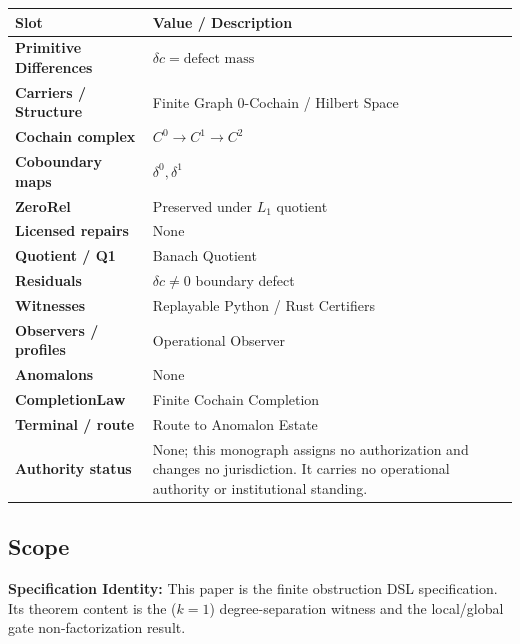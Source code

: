 \documentclass[
]{article}
\renewenvironment{quote}
  {\begin{leftbar}\small}
  {\end{leftbar}}
\begin{document}
\begin{longtable}[]{@{}
  >{\raggedright\arraybackslash}p{}
  >{\raggedright\arraybackslash}p{}@{}}
\toprule\noalign{}
\begin{minipage}[b]{\linewidth}\raggedright
Slot
\end{minipage} & \begin{minipage}[b]{\linewidth}\raggedright
Value / Description
\end{minipage} \\
\midrule\noalign{}
\endhead
\bottomrule\noalign{}
\endlastfoot
\textbf{Primitive Differences} & \(\delta c = \text{{defect mass}}\) \\
\textbf{Carriers / Structure} & Finite Graph 0-Cochain / Hilbert Space \\
\textbf{Cochain complex} & \(C^0 \to C^1 \to C^2\) \\
\textbf{Coboundary maps} & \(\delta^0, \delta^1\) \\
\textbf{ZeroRel} & Preserved under \(L_1\) quotient \\
\textbf{Licensed repairs} & None \\
\textbf{Quotient / Q1} & Banach Quotient \\
\textbf{Residuals} & \(\delta c \neq 0\) boundary defect \\
\textbf{Witnesses} & Replayable Python / Rust Certifiers \\
\textbf{Observers / profiles} & Operational Observer \\
\textbf{Anomalons} & None \\
\textbf{CompletionLaw} & Finite Cochain Completion \\
\textbf{Terminal / route} & Route to Anomalon Estate \\
\textbf{Authority status} & None; this monograph assigns no authorization and changes no jurisdiction. It carries no operational authority or institutional standing. \\
\end{longtable}

\subsection{Scope}\label{scope}

\begin{quote}
\textbf{Specification Identity:} This paper is the finite obstruction DSL specification. Its theorem content is the (\(k=1\)) degree-separation witness and the local/global gate non-factorization result.
\end{quote}
\end{document}
